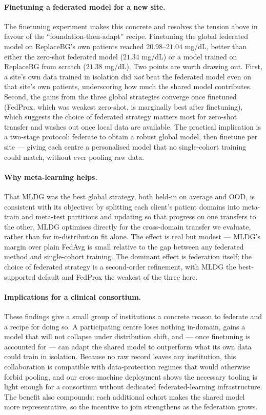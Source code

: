 \documentclass[10pt,letterpaper]{article}
\begin{document}
\paragraph{Finetuning a federated model for a new site.} The finetuning
experiment makes this concrete and resolves the tension above in favour of the
``foundation-then-adapt'' recipe. Finetuning the global federated model on
ReplaceBG's own patients reached $20.98$--$21.04$ mg/dL, better than either the
zero-shot federated model ($21.34$ mg/dL) or a model trained on ReplaceBG from
scratch ($21.38$ mg/dL). Two points are worth drawing out. First, a site's own
data trained in isolation did \emph{not} beat the federated model even on that
site's own patients, underscoring how much the shared model contributes.
Second, the gains from the three global strategies converge once finetuned
(FedProx, which was weakest zero-shot, is marginally best after finetuning),
which suggests the choice of federated strategy matters most for zero-shot
transfer and washes out once local data are available. The practical
implication is a two-stage protocol: federate to obtain a robust global model,
then finetune per site --- giving each centre a personalised model that no
single-cohort training could match, without ever pooling raw data.

\paragraph{Why meta-learning helps.} That MLDG was the best global strategy, both
held-in on average and OOD, is consistent with its objective: by splitting each
client's patient domains into meta-train and meta-test partitions and updating so
that progress on one transfers to the other, MLDG optimises directly for the
cross-domain transfer we evaluate, rather than for in-distribution fit alone. The
effect is real but modest --- MLDG's margin over plain FedAvg is small relative to
the gap between any federated method and single-cohort training. The dominant
effect is federation itself; the choice of federated strategy is a second-order
refinement, with MLDG the best-supported default and FedProx the weakest of the
three here.

\paragraph{Implications for a clinical consortium.} These findings give a small
group of institutions a concrete reason to federate and a recipe for doing so.
A participating centre loses nothing in-domain, gains a model that will not
collapse under distribution shift, and --- once finetuning is accounted for ---
can adapt the shared model to outperform what its own data could train in
isolation. Because no raw record leaves any institution, this collaboration is
compatible with data-protection regimes that would otherwise forbid pooling, and
our cross-machine deployment shows the necessary tooling is light enough for a
consortium without dedicated federated-learning infrastructure. The benefit also
compounds: each additional cohort makes the shared model more representative, so
the incentive to join strengthens as the federation grows.
\end{document}
